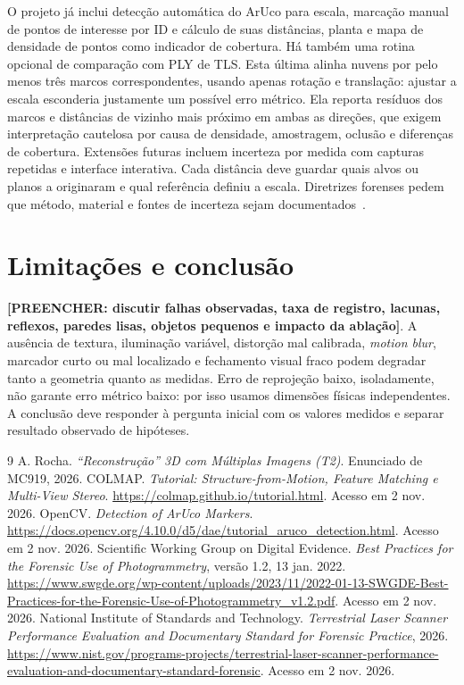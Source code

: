 \documentclass[10pt,a4paper]{article}
\newcommand{\Resultado}[1]{\textcolor{red!65!black}{\textbf{[PREENCHER: #1]}}}
\begin{document}
O projeto já inclui detecção automática do ArUco para escala, marcação manual de pontos de interesse por ID e cálculo de suas distâncias, planta e mapa de densidade de pontos como indicador de cobertura. Há também uma rotina opcional de comparação com PLY de TLS. Esta última alinha nuvens por pelo menos três marcos correspondentes, usando apenas rotação e translação: ajustar a escala esconderia justamente um possível erro métrico. Ela reporta resíduos dos marcos e distâncias de vizinho mais próximo em ambas as direções, que exigem interpretação cautelosa por causa de densidade, amostragem, oclusão e diferenças de cobertura. Extensões futuras incluem incerteza por medida com capturas repetidas e interface interativa. Cada distância deve guardar quais alvos ou planos a originaram e qual referência definiu a escala. Diretrizes forenses pedem que método, material e fontes de incerteza sejam documentados~\cite{swgde}.

\section{Limitações e conclusão}
\Resultado{discutir falhas observadas, taxa de registro, lacunas, reflexos, paredes lisas, objetos pequenos e impacto da ablação}. A ausência de textura, iluminação variável, distorção mal calibrada, \emph{motion blur}, marcador curto ou mal localizado e fechamento visual fraco podem degradar tanto a geometria quanto as medidas. Erro de reprojeção baixo, isoladamente, não garante erro métrico baixo: por isso usamos dimensões físicas independentes. A conclusão deve responder à pergunta inicial com os valores medidos e separar resultado observado de hipóteses.

\begin{thebibliography}{9}\small
{} A. Rocha. \emph{``Reconstrução'' 3D com Múltiplas Imagens (T2)}. Enunciado de MC919, 2026.
 COLMAP. \emph{Tutorial: Structure-from-Motion, Feature Matching e Multi-View Stereo}. \url{https://colmap.github.io/tutorial.html}. Acesso em 2 nov. 2026.
 OpenCV. \emph{Detection of ArUco Markers}. \url{https://docs.opencv.org/4.10.0/d5/dae/tutorial_aruco_detection.html}. Acesso em 2 nov. 2026.
 Scientific Working Group on Digital Evidence. \emph{Best Practices for the Forensic Use of Photogrammetry}, versão 1.2, 13 jan. 2022. \url{https://www.swgde.org/wp-content/uploads/2023/11/2022-01-13-SWGDE-Best-Practices-for-the-Forensic-Use-of-Photogrammetry_v1.2.pdf}. Acesso em 2 nov. 2026.
 National Institute of Standards and Technology. \emph{Terrestrial Laser Scanner Performance Evaluation and Documentary Standard for Forensic Practice}, 2026. \url{https://www.nist.gov/programs-projects/terrestrial-laser-scanner-performance-evaluation-and-documentary-standard-forensic}. Acesso em 2 nov. 2026.
\end{thebibliography}
\end{document}
